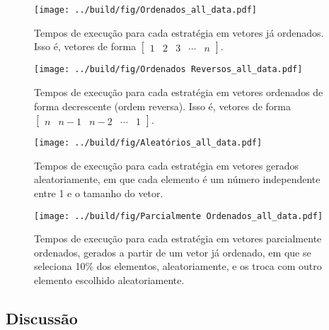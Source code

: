 \documentclass[10pt,oneside,onecolumn]{article}
\begin{document}


\begin{figure}[H]
	\centering
	\texttt{[image: ../build/fig/Ordenados\_all\_data.pdf]}
	\captionsetup{skip=0pt} %
	\caption{Tempos de execução para cada estratégia em vetores já ordenados.
	Isso é, vetores de forma $\begin{bmatrix} 1 & 2 & 3 & \cdots & n \end{bmatrix}$.}
	\label{fig:ord}
\end{figure}

\begin{figure}[H]
	\centering
	\texttt{[image: ../build/fig/Ordenados Reversos\_all\_data.pdf]}
	\captionsetup{skip=0pt} %
	\caption{Tempos de execução para cada estratégia em vetores ordenados de
	forma decrescente (ordem reversa). Isso é, vetores de forma
	$\begin{bmatrix} n & n-1 & n-2 & \cdots & 1 \end{bmatrix}$.}
	\label{fig:rev}
\end{figure}

\begin{figure}[H]
	\centering
	\texttt{[image: ../build/fig/Aleatórios\_all\_data.pdf]}
	\captionsetup{skip=0pt} %
	\caption{Tempos de execução para cada estratégia em vetores gerados
	aleatoriamente, em que cada elemento é um número independente entre 1 e o
	tamanho do vetor.}
	\label{fig:rand}
\end{figure}

\begin{figure}[H]
	\centering
	\texttt{[image: ../build/fig/Parcialmente Ordenados\_all\_data.pdf]}
	\captionsetup{skip=0pt} %
	\caption{Tempos de execução para cada estratégia em vetores parcialmente
	ordenados, gerados a partir de um vetor já ordenado, em que se seleciona
	10\% dos elementos, aleatoriamente, e os troca com outro elemento escolhido
	aleatoriamente.}
	\label{fig:part}
\end{figure}

\subsection{Discussão}
\end{document}
